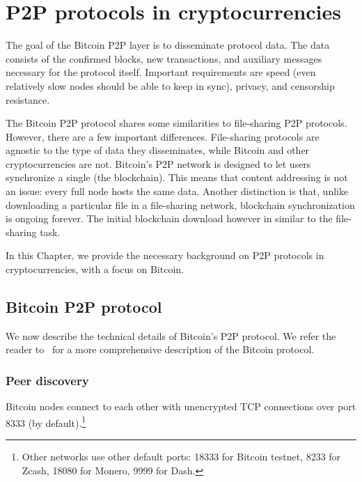 \chapter{P2P protocols in cryptocurrencies}

\label{Chapter02IntroP2P}


The goal of the Bitcoin P2P layer is to disseminate protocol data.
The data consists of the confirmed blocks, new transactions, and auxiliary messages necessary for the protocol itself.
Important requirements are speed (even relatively slow nodes should be able to keep in sync), privacy, and censorship resistance.

The Bitcoin P2P protocol shares some similarities to file-sharing P2P protocols.
However, there are a few important differences.
File-sharing protocols are agnostic to the type of data they disseminates, while Bitcoin and other cryptocurrencies are not.
Bitcoin's P2P network is designed to let users synchronize a single (the blockchain).
This means that content addressing is not an issue: every full node hosts the same data.
Another distinction is that, unlike downloading a particular file in a file-sharing network, blockchain synchronization is ongoing forever.
The initial blockchain download however in similar to the file-sharing task.

In this Chapter, we provide the necessary background on P2P protocols in cryptocurrencies, with a focus on Bitcoin.


\section{Bitcoin P2P protocol}

We now describe the technical details of Bitcoin's P2P protocol.
We refer the reader to~\cite{BitcoinWiki, Garay2015} for a more comprehensive description of the Bitcoin protocol.

\subsection{Peer discovery}

Bitcoin nodes connect to each other with unencrypted TCP connections over port 8333 (by default).\footnote{Other networks use other default ports: 18333 for Bitcoin testnet, 8233 for Zcash, 18080 for Monero, 9999 for Dash.}

